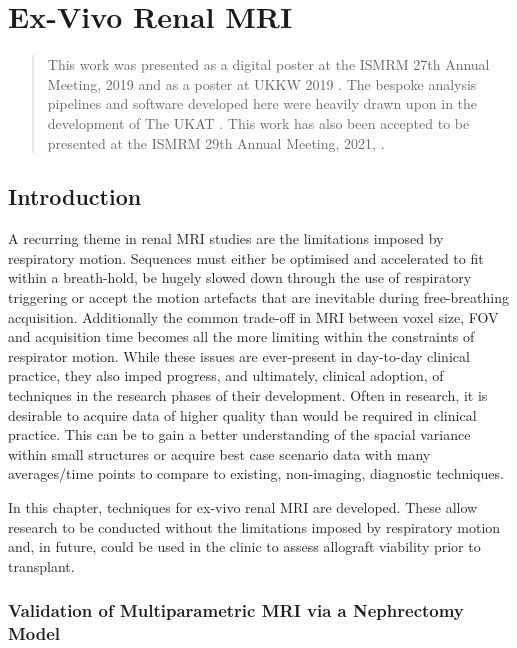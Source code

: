 \chapter{Ex-Vivo Renal MRI}
\label{chap:ex}

\begin{abstract}
	This work was presented as a digital poster at the \ac{ISMRM} 27th Annual Meeting, 2019 \cite{daniel_effects_2019} and as a poster at \ac{UKKW} 2019 \cite{kazmi_determining_2019-1}. The bespoke analysis pipelines and software developed here were heavily drawn upon in the development of The \ac{UKAT} \cite{nery_ukrin_2020}. This work has also been accepted to be presented at the \ac{ISMRM} 29th Annual Meeting, 2021, \cite{daniel_ukrin_2021}.
\end{abstract}
\acresetall
\newpage
\section{Introduction}

A recurring theme in renal \ac{MRI} studies are the limitations imposed by respiratory motion. Sequences must either be optimised and accelerated to fit within a breath-hold, be hugely slowed down through the use of respiratory triggering or accept the motion artefacts that are inevitable during free-breathing acquisition. Additionally the common trade-off in \ac{MRI} between voxel size, \ac{FOV} and acquisition time becomes all the more limiting within the constraints of respirator motion. While these issues are ever-present in day-to-day clinical practice, they also imped progress, and ultimately, clinical adoption, of techniques in the research phases of their development. Often in research, it is desirable to acquire data of higher quality than would be required in clinical practice. This can be to gain a better understanding of the spacial variance within small structures or acquire best case scenario data with many averages/time points to compare to existing, non-imaging, diagnostic techniques.

In this chapter, techniques for ex-vivo renal \ac{MRI} are developed. These allow research to be conducted without the limitations imposed by respiratory motion and, in future, could be used in the clinic to assess allograft viability prior to transplant.

\subsection{Validation of Multiparametric MRI via a Nephrectomy Model}


